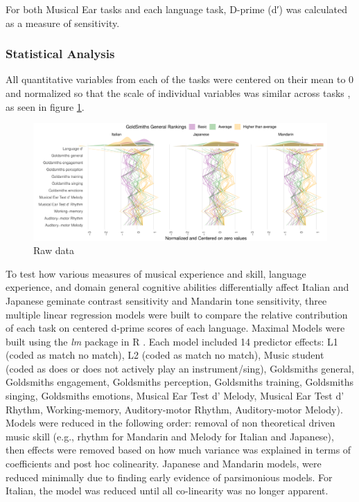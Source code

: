 \documentclass[a4paper]{article}
\begin{document}
For both Musical Ear tasks and each language task,  D-prime (d′) was calculated as a measure of sensitivity\cite{Macmillan_Creelman_2004}. 

\subsubsection{Statistical Analysis}


All quantitative variables from each of the tasks were centered on their mean to 0 and normalized so that the scale of individual variables was similar across tasks , as seen in figure \ref{fig:centered_data}.

\begin{figure}[t]
  \centering
  \includegraphics[width=.9\textwidth]{SP_24_visuals/by_gs.pdf}
  \caption{Raw data}
  \label{fig:centered_data}
\end{figure}

To test how various measures of musical experience and skill, language experience, and domain general cognitive abilities differentially affect Italian and Japanese geminate contrast sensitivity and Mandarin tone sensitivity, three multiple linear regression models were built to compare the relative contribution of each task on centered d-prime scores of each language. Maximal Models were built using the \textit{lm} package \cite{lmPackage} in R \cite{RManual}. Each model included 14 predictor effects: L1 (coded as match no match), L2 (coded as match no match), Music student (coded as does or does not actively play an instrument/sing), Goldsmiths general, Goldsmiths engagement, Goldsmiths perception, Goldsmiths training, Goldsmiths singing, Goldsmiths emotions, Musical Ear Test d' Melody, Musical Ear Test d' Rhythm, Working-memory, Auditory-motor Rhythm, Auditory-motor Melody). Models were reduced in the following order: removal of non theoretical driven music skill (e.g., rhythm for Mandarin and Melody for Italian and Japanese), then effects were removed based on how much variance was explained in terms of coefficients and post hoc colinearity. Japanese and Mandarin models, were reduced minimally due to finding early evidence of parsimonious models. For Italian, the model was reduced until all co-linearity was no longer apparent. 
\end{document}

